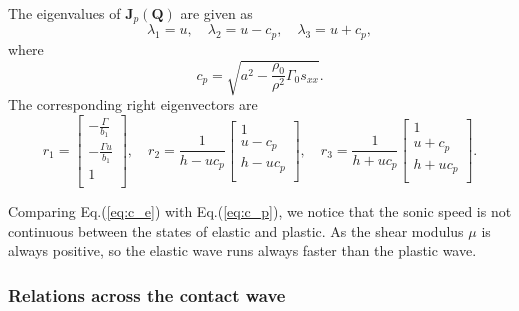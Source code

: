 \documentclass{article}
\numberwithin{equation}{section}
\numberwithin{table}{section}
\begin{document}
The eigenvalues of $\mathbf{J}_p(\mathbf{Q})$ are given as
$$\lambda_1 = u,\quad \lambda_2 = u-c_p, \quad \lambda_3 = u+c_p,$$
where
\begin{equation}\label{eq:c_p}
   c_p = \sqrt{a^2-\frac{\rho_0}{\rho^2}\Gamma_0 s_{xx}}.
\end{equation}
The corresponding right eigenvectors are
\begin{equation}\label{eq:eivp}
  r_1 = \left[ \begin{array}{l}
	  -\frac{\Gamma}{b_1} \\
	  -\frac{\Gamma u}{b_1} \\
	  1\\
  \end{array}\right], \quad
  r_2 = \frac{1}{h-uc_p} \left[  \begin{array}{l}
	  1 \\
	  u-c_p \\
	  h-uc_p\\
  \end{array}\right], \quad
 r_3 = \frac{1}{h+uc_p}\left[ \begin{array}{l}
	  1 \\
	  u+c_p \\
	  h+uc_p\\
  \end{array}\right].
\end{equation}

Comparing Eq.(\ref{eq:c_e}) with Eq.(\ref{eq:c_p}), we notice that the sonic speed is not continuous between the states of elastic and plastic. As the shear modulus $\mu$ is always positive, so the elastic wave runs always faster than the plastic wave.  %

\subsubsection{Relations across the contact wave}\label{sec:contactp}
\end{document}
